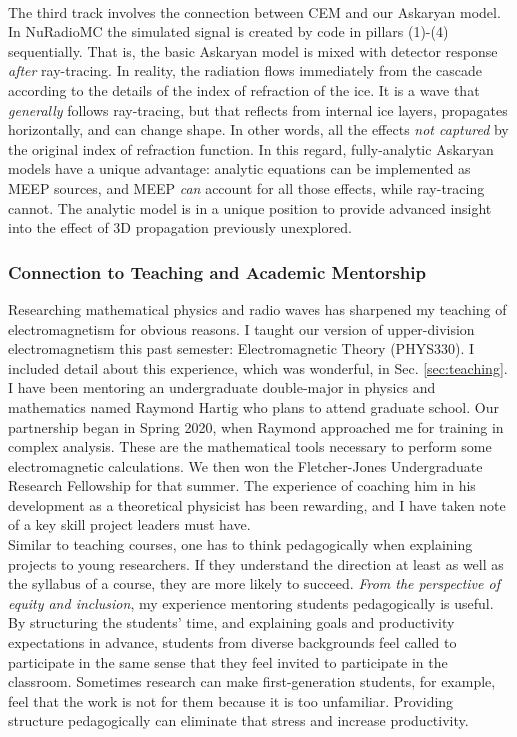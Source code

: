 \documentclass[../../../main.tex]{subfiles}
\begin{document}
\\
\vspace{0.25cm}
The third track involves the connection between CEM and our Askaryan model.  In NuRadioMC the simulated signal is created by code in pillars (1)-(4) sequentially.  That is, the basic Askaryan model is mixed with detector response \textit{after} ray-tracing.  In reality, the radiation flows immediately from the cascade according to the details of the index of refraction of the ice.  It is a wave that \textit{generally} follows ray-tracing, but that reflects from internal ice layers, propagates horizontally, and can change shape.  In other words, all the effects \textit{not captured} by the original index of refraction function.  In this regard, fully-analytic Askaryan models have a unique advantage: analytic equations can be implemented as MEEP sources, and MEEP \textit{can} account for all those effects, while ray-tracing cannot.  The analytic model is in a unique position to provide advanced insight into the effect of 3D propagation previously unexplored.

\subsubsection{Connection to Teaching and Academic Mentorship}

Researching mathematical physics and radio waves has sharpened my teaching of electromagnetism for obvious reasons.  I taught our version of upper-division electromagnetism this past semester: Electromagnetic Theory (PHYS330).  I included detail about this experience, which was wonderful, in Sec. \ref{sec:teaching}.
\\
\vspace{0.25cm}
I have been mentoring an undergraduate double-major in physics and mathematics named Raymond Hartig who plans to attend graduate school.  Our partnership began in Spring 2020, when Raymond approached me for training in complex analysis.  These are the mathematical tools necessary to perform some electromagnetic calculations.  We then won the Fletcher-Jones Undergraduate Research Fellowship for that summer.  The experience of coaching him in his development as a theoretical physicist has been rewarding, and I have taken note of a key skill project leaders must have.
\\
\vspace{0.25cm}
Similar to teaching courses, one has to think pedagogically when explaining projects to young researchers.  If they understand the direction at least as well as the syllabus of a course, they are more likely to succeed.  \textit{From the perspective of equity and inclusion}, my experience mentoring students pedagogically is useful.  By structuring the students' time, and explaining goals and productivity expectations in advance, students from diverse backgrounds feel called to participate in the same sense that they feel invited to participate in the classroom.  Sometimes research can make first-generation students, for example, feel that the work is not for them because it is too unfamiliar.  Providing structure pedagogically can eliminate that stress and increase productivity.
\end{document}
